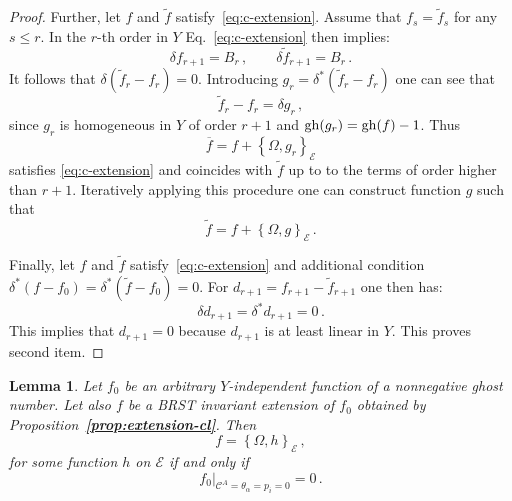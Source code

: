 \documentclass[a4paper,11pt]{amsart}
\newtheorem{lemma}[thm]{Lemma}
\numberwithin{thm}{section} %
\numberwithin{equation}{section} %
\numberwithin{figure}{section} %
\newcommand{\bref}[1]{{\bf \ref{#1}}}
\newcommand{\pb}[2]{\left\{{}#1{},{}#2{}\right\}}
\newcommand{\gh}[1]{{\rm gh}(#1)}
\renewcommand{\:}{{\rm\, :\,}}
\def\bar{\overline}
\def\cc{{\mathcal C}}
\def\E{{ \mathcal E}}
\begin{document}
\begin{proof}
Further, let $f$ and $\tilde f$ satisfy~\eqref{eq:c-extension}.
Assume that $f_s={\tilde  f}_s$ for any $s \leq r$.  In the
$r$-th order in $Y$ Eq.~\eqref{eq:c-extension} then implies:
\begin{equation}
\delta f_{r+1}=B_r\,, \qquad \delta {{\tilde f}_{r+1}}=B_r\,.
\end{equation}
It follows that $\delta({\tilde f}_r-f_r)=0$. Introducing
$g_r=\delta^*({\tilde f}_r-f_r)$ one can see that
\begin{equation}
  {\tilde f}_r-f_r=\delta g_r\,,
\end{equation}
since $g_r$ is homogeneous in $Y$ of order $r+1$ and
$\gh{g_r}=\gh{f}-1$. Thus
\begin{equation}
{\bar f}=f+\pb{\Omega}{g_r}_\E
\end{equation}
satisfies \eqref{eq:c-extension} and coincides with $\tilde f$ up to
to the terms of order higher than $r+1$. Iteratively applying
this procedure one can construct function $g$
such that
\begin{equation}
  {\tilde f}=f+\pb{\Omega}{g}_\E\,.
\end{equation}


Finally, let $f$ and $\tilde f$ satisfy~\eqref{eq:c-extension}
and additional condition
$\delta^* (f-f_0)=\delta^* ({\tilde f}-f_0)=0$. For
$d_{r+1}=f_{r+1}-{\tilde f}_{r+1}$ one then has:
$$
\delta d_{r+1}=\delta^* d_{r+1}=0\,.
$$
This implies that $d_{r+1}=0$ because $d_{r+1}$ is at least linear in
$Y$.  This proves second item.
\end{proof}
\begin{lemma}\label{lemma:koszul-cl}
Let $f_0$ be an arbitrary $Y$-independent function of
a nonnegative  ghost number.  Let also $f$ be a BRST invariant
extension of $f_0$ obtained by Proposition~\bref{prop:extension-cl}.  Then
\begin{equation}
  f=\pb{\Omega}{h}_\E\,,
\end{equation}
for some function $h$ on $\E$ if and only if
\begin{equation}
  f_0{\bigr|}_{\cc^A=\theta_\alpha=p_i=0}=0\,.
\end{equation}
\end{lemma}
\end{document}
